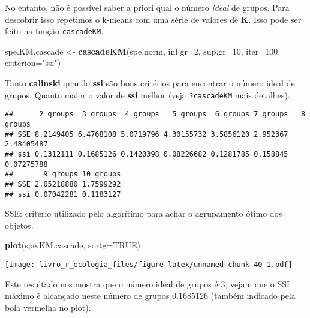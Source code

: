 \documentclass[
]{book}
\newenvironment{Shaded}{\begin{snugshade}}{\end{snugshade}}
\newcommand{\CommentTok}[1]{\textcolor[rgb]{0.56,0.35,0.01}{\textit{#1}}}
\newcommand{\DataTypeTok}[1]{\textcolor[rgb]{0.13,0.29,0.53}{#1}}
\newcommand{\DecValTok}[1]{\textcolor[rgb]{0.00,0.00,0.81}{#1}}
\newcommand{\KeywordTok}[1]{\textcolor[rgb]{0.13,0.29,0.53}{\textbf{#1}}}
\newcommand{\NormalTok}[1]{#1}
\newcommand{\OperatorTok}[1]{\textcolor[rgb]{0.81,0.36,0.00}{\textbf{#1}}}
\newcommand{\OtherTok}[1]{\textcolor[rgb]{0.56,0.35,0.01}{#1}}
\newcommand{\StringTok}[1]{\textcolor[rgb]{0.31,0.60,0.02}{#1}}
\begin{document}
No entanto, não é possível saber a priori qual o número \emph{ideal} de grupos. Para descobrir isso repetimos o k-means com uma série de valores de \textbf{K}. Isso pode ser feito na função \texttt{cascadeKM}.

\begin{Shaded}
\begin{Highlighting}[]
\NormalTok{spe.KM.cascade <-}\StringTok{ }\KeywordTok{cascadeKM}\NormalTok{(spe.norm, }\DataTypeTok{inf.gr=}\DecValTok{2}\NormalTok{, }\DataTypeTok{sup.gr=}\DecValTok{10}\NormalTok{, }\DataTypeTok{iter=}\DecValTok{100}\NormalTok{, }\DataTypeTok{criterion=}\StringTok{"ssi"}\NormalTok{) }
\end{Highlighting}
\end{Shaded}

Tanto \textbf{calinski} quando \textbf{ssi} são bons critérios para encontrar o número ideal de grupos. Quanto maior o valor de \textbf{ssi} melhor (veja \texttt{?cascadeKM} mais detalhes).

\begin{Shaded}
\end{Shaded}

\begin{verbatim}
##      2 groups  3 groups  4 groups   5 groups  6 groups 7 groups   8 groups
## SSE 8.2149405 6.4768108 5.0719796 4.30155732 3.5856120 2.952367 2.48405487
## ssi 0.1312111 0.1685126 0.1420398 0.08226682 0.1281785 0.158845 0.07275788
##       9 groups 10 groups
## SSE 2.05218880 1.7599292
## ssi 0.07042281 0.1183127
\end{verbatim}

SSE: critério utilizado pelo algorítimo para achar o agrupamento ótimo dos objetos.

\begin{Shaded}
\begin{Highlighting}[]
\KeywordTok{plot}\NormalTok{(spe.KM.cascade, }\DataTypeTok{sortg=}\OtherTok{TRUE}\NormalTok{)}
\end{Highlighting}
\end{Shaded}

\texttt{[image: livro\_r\_ecologia\_files/figure-latex/unnamed-chunk-40-1.pdf]}

Este resultado nos mostra que o número ideal de grupos é 3, vejam que o SSI máximo é alcançado neste número de grupos 0.1685126 (também indicado pela bola vermelha no plot).
\end{document}
